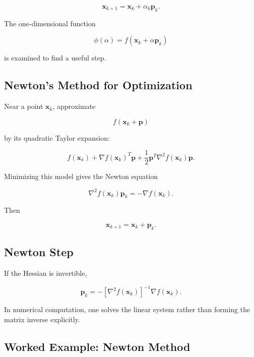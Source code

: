 \[
\boxed{
\mathbf{x}_{k+1}
=
\mathbf{x}_k
+
\alpha_k\mathbf{p}_k.
}
\]

The one-dimensional function

\[
\boxed{
\phi(\alpha)
=
f
(
\mathbf{x}_k+\alpha\mathbf{p}_k
)
}
\]

is examined to find a useful step.

\subsection{Newton's Method for Optimization}
\label{subsec:newtons-method-optimization}

Near a point \(\mathbf{x}_k\), approximate

\[
f(\mathbf{x}_k+\mathbf{p})
\]

by its quadratic Taylor expansion:

\[
f(\mathbf{x}_k)
+
\nabla f(\mathbf{x}_k)^T\mathbf{p}
+
\frac12
\mathbf{p}^T
\nabla^2f(\mathbf{x}_k)
\mathbf{p}.
\]

Minimizing this model gives the Newton equation

\[
\boxed{
\nabla^2f(\mathbf{x}_k)\mathbf{p}_k
=
-
\nabla f(\mathbf{x}_k).
}
\]

Then

\[
\boxed{
\mathbf{x}_{k+1}
=
\mathbf{x}_k+\mathbf{p}_k.
}
\]

\subsection{Newton Step}
\label{subsec:newton-step-optimization}

If the Hessian is invertible,

\[
\boxed{
\mathbf{p}_k
=
-
[
\nabla^2f(\mathbf{x}_k)
]^{-1}
\nabla f(\mathbf{x}_k).
}
\]

In numerical computation, one solves the linear system rather than
forming the matrix inverse explicitly.

\subsection{Worked Example: Newton Method}
\label{subsec:worked-newton-optimization}

